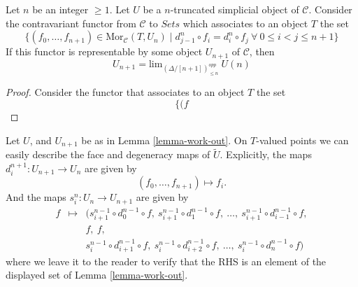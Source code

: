 \begin{lemma}
\label{lemma-formula-limit}
Let $n$ be an integer $\geq 1$.
Let $U$ be a $n$-truncated simplicial object of $\mathcal{C}$.
Consider the contravariant functor from $\mathcal{C}$ to
$\textit{Sets}$ which associates to an object $T$ the set
$$
\{ (f_0,\ldots,f_{n + 1}) \in \text{Mor}_{\mathcal{C}}(T, U_n)
\mid
d^n_{j - 1} \circ f_i = d^n_i \circ f_j\ 
\forall\ 0\leq i < j\leq n + 1\}
$$
If this functor is representable by some object $U_{n + 1}$
of $\mathcal{C}$, then
$$
U_{n + 1} = \text{lim}_{(\Delta/[n + 1])_{\leq n}^{opp}}\ U(n)
$$
\end{lemma}

\begin{proof}
Consider the functor that associates to an object
$T$ the set
$$
\{ (f
$$



\end{proof}


\begin{remark}
\label{remark-explicit-face-degeneracy}
Let $U$, and $U_{n + 1}$ be as in Lemma \ref{lemma-work-out}.
On $T$-valued points we can easily describe the face
and degeneracy maps of $\tilde U$.
Explicitly, the maps $d^{n + 1}_i : U_{n + 1} \to U_n$
are given by
$$
(f_0, \ldots, f_{n + 1}) \longmapsto f_i.
$$
And the maps $s^n_i : U_n \to U_{n + 1}$ are given by
\begin{eqnarray*}
f & \longmapsto & (
s^{n - 1}_{i + 1} \circ d^{n - 1}_0 \circ f,\ 
s^{n - 1}_{i + 1} \circ d^{n - 1}_1 \circ f,\ 
\ldots,\ 
s^{n - 1}_{i + 1} \circ d^{n - 1}_{i - 1} \circ f, \\
& &
f,\ 
f, \\
& &
s^{n - 1}_i \circ d^{n - 1}_{i + 1} \circ f,\ 
s^{n - 1}_i \circ d^{n - 1}_{i + 2} \circ f,\ 
\ldots,\ 
s^{n - 1}_i \circ d^{n - 1}_n \circ f
)
\end{eqnarray*}
where we leave it to the reader to verify that the RHS
is an element of the displayed set of Lemma \ref{lemma-work-out}.
\end{remark}

